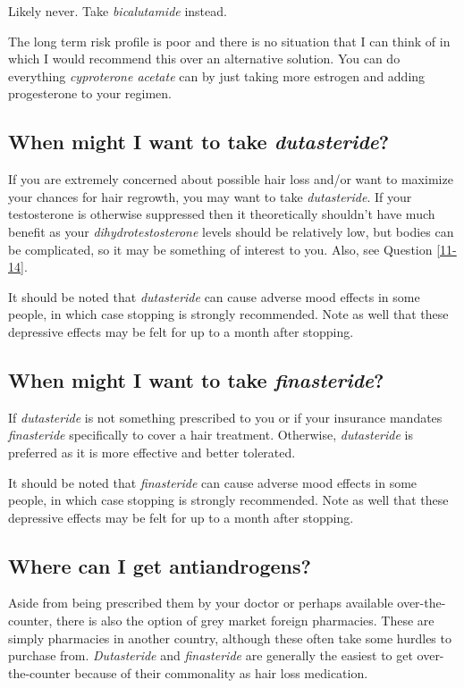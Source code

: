 \documentclass{article}
\begin{document}
Likely never. Take \textit{bicalutamide} instead.

The long term risk profile is poor and there is no situation that I can think of in which I would recommend this over an alternative solution. You can do everything \textit{cyproterone acetate} can by just taking more estrogen and adding progesterone to your regimen.

\subsection{When might I want to take \textit{dutasteride}?}

If you are extremely concerned about possible hair loss and/or want to maximize your chances for hair regrowth, you may want to take \textit{dutasteride}. If your testosterone is otherwise suppressed then it theoretically shouldn’t have much benefit as your \textit{dihydrotestosterone} levels should be relatively low, but bodies can be complicated, so it may be something of interest to you. Also, see Question \ref{11-14}.

It should be noted that \textit{dutasteride} can cause adverse mood effects in some people, in which case stopping is strongly recommended. Note as well that these depressive effects may be felt for up to a month after stopping. 

\subsection{When might I want to take \textit{finasteride}?}

If \textit{dutasteride }is not something prescribed to you or if your insurance mandates \textit{finasteride} specifically to cover a hair treatment. Otherwise, \textit{dutasteride} is preferred as it is more effective and better tolerated.

It should be noted that \textit{finasteride} can cause adverse mood effects in some people, in which case stopping is strongly recommended. Note as well that these depressive effects may be felt for up to a month after stopping.

\subsection{Where can I get antiandrogens?}

Aside from being prescribed them by your doctor or perhaps available over-the-counter, there is also the option of grey market foreign pharmacies. These are simply pharmacies in another country, although these often take some hurdles to purchase from. \textit{Dutasteride} and \textit{finasteride }are generally the easiest to get over-the-counter because of their commonality as hair loss medication.
\end{document}
